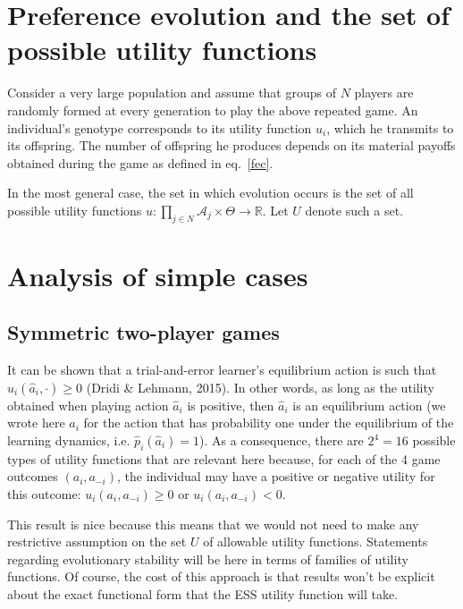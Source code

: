 \documentclass[11pt,reqno]{amsart}
\newcommand{\Et}{\Theta}
\newcommand{\ac}{a}
\newcommand{\Ac}{\mathcal{A}}
\newcommand{\p}{p}
\newcommand{\Rn}{\mathds{R}}
\newcommand{\np}{N}%
\newcommand{\om}{o}
\newcommand{\Om}{O}
\newcommand{\fc}{f}
\newcommand{\pf}{u}
\newcommand{\Pf}{U}
\begin{document}
\section{Preference evolution and the set of possible utility functions}

Consider a very large population and assume that groups of $\np$ players are randomly formed at every generation to play the above repeated game. An individual's genotype corresponds to its utility function $\pf_i$, which he transmits to its offspring. The number of offspring he produces depends on its material payoffs obtained during the game as defined in eq.~\ref{fec}.

In the most general case, the set in which evolution occurs is the set of all possible utility functions $\pf : \prod_{j\in \np} \Ac_j \times \Et  \to \Rn$. Let $\Pf$ denote such a set.%

\section{Analysis of simple cases}

\subsection{Symmetric two-player games}

It can be shown that a trial-and-error learner's equilibrium action is such that $\pf_i(\hat{\ac}_i,\cdot) \geq 0$ (Dridi \& Lehmann, 2015). In other words, as long as the utility obtained when playing action $\hat{\ac}_i$ is positive, then $\hat{\ac}_i$ is an equilibrium action (we wrote here $\hat{\ac}_i$ for the action that has probability one under the equilibrium of the learning dynamics, i.e. $\hat{\p}_i(\hat{\ac}_i)=1$). As a consequence, there are $2^4=16$ possible types of utility functions that are relevant here because, for each of the 4 game outcomes $(\ac_i,\ac_{-i})$, the individual may have a positive or negative utility for this outcome: $\pf_i(\ac_i,\ac_{-i}) \geq 0$ or $\pf_i(\ac_i,\ac_{-i}) < 0$.

This result is nice because this means that we would not need to make any restrictive assumption on the set $\Pf$ of allowable utility functions. Statements regarding evolutionary stability will be here in terms of families of utility functions. Of course, the cost of this approach is that results won't be explicit about the exact functional form that the ESS utility function will take.
\end{document}
